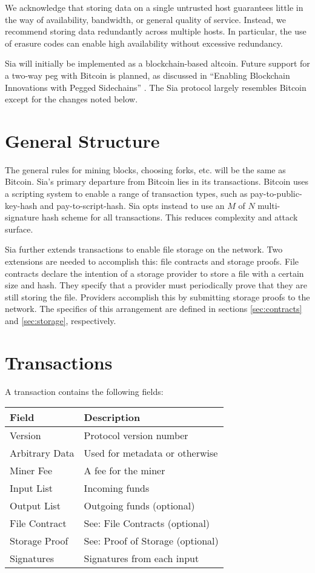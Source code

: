 \documentclass[twocolumn]{article}
\begin{document}
We acknowledge that storing data on a single untrusted host guarantees little in the way of availability, bandwidth, or general quality of service.
Instead, we recommend storing data redundantly across multiple hosts.
In particular, the use of erasure codes can enable high availability without excessive redundancy.

Sia will initially be implemented as a blockchain-based altcoin.
Future support for a two-way peg with Bitcoin is planned, as discussed in ``Enabling Blockchain Innovations with Pegged Sidechains'' \cite{side}.
The Sia protocol largely resembles Bitcoin except for the changes noted below.

\section{General Structure}
The general rules for mining blocks, choosing forks, etc. will be the same as Bitcoin.
Sia's primary departure from Bitcoin lies in its transactions.
Bitcoin uses a scripting system to enable a range of transaction types, such as pay-to-public-key-hash and pay-to-script-hash.
Sia opts instead to use an $M$ of $N$ multi-signature hash scheme for all transactions.
This reduces complexity and attack surface.

Sia further extends transactions to enable file storage on the network.
Two extensions are needed to accomplish this: file contracts and storage proofs.
File contracts declare the intention of a storage provider to store a file with a certain size and hash.
They specify that a provider must periodically prove that they are still storing the file.
Providers accomplish this by submitting storage proofs to the network.
The specifics of this arrangement are defined in sections \ref{sec:contracts} and \ref{sec:storage}, respectively.

\section{Transactions}
A transaction contains the following fields:
\begin{tabular}{| l | l |}
	\hline
	\textbf{Field} & \textbf{Description} \\ \hline
	Version        & Protocol version number \\ \hline
	Arbitrary Data & Used for metadata or otherwise \\ \hline
	Miner Fee      & A fee for the miner \\ \hline
	Input List     & Incoming funds \\ \hline
	Output List    & Outgoing funds (optional) \\ \hline
	File Contract  & See: File Contracts (optional) \\ \hline
	Storage Proof  & See: Proof of Storage (optional) \\ \hline
	Signatures     & Signatures from each input \\ \hline
\end{tabular}
\end{document}
